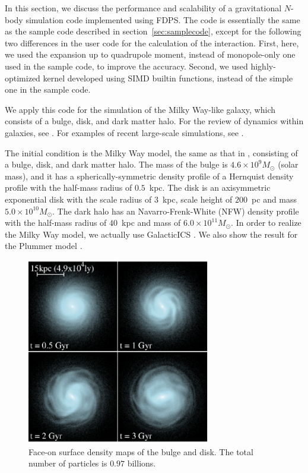In this section, we discuss the performance and scalability of a
gravitational $N$-body simulation code implemented using FDPS. The
code is essentially the same as the sample code described in
section~\ref{sec:samplecode}, except for the following two differences
in the user code for the calculation of the interaction. First, here,
we used the expansion up to quadrupole moment, instead of
monopole-only one used in the sample code, to improve the
accuracy. Second, we used highly-optimized kernel developed using SIMD
builtin functions, instead of the simple one in the sample code.

We apply this code for the simulation of the Milky Way-like galaxy,
which consists of a bulge, disk, and dark matter halo.  For the review
of dynamics within galaxies, see
\cite{2014PASA...31...35D}. For examples of recent large-scale
simulations, see \cite{2011ApJ...730..109F, Bedorf:2014:PGT:2683593.2683600}.

The initial condition is the Milky Way model, the same as that
in \cite{Bedorf:2014:PGT:2683593.2683600}, consisting of a bulge,
disk, and dark matter halo.  The mass of the bulge is $4.6 \times 10^9
M_\odot$ (solar mass), and it has a spherically-symmetric density
profile of a Hernquist density profile \cite{1990ApJ...356..359H} with
the half-mass radius of $0.5$~kpc. The disk is an axisymmetric
exponential disk with the scale radius of $3$~kpc, scale height of
$200$~pc and mass $5.0 \times 10^{10}M_\odot$. The dark halo has an
Navarro-Frenk-White (NFW) density profile \cite{1996ApJ...462..563N}
with the half-mass radius of $40$~kpc and mass of $6.0 \times 10^{11}
M_\odot$. In order to realize the Milky Way model, we actually use
GalacticICS \cite{2005ApJ...631..838W}.
We also show the result for the Plummer
model \cite{1911MNRAS..71..460P}. 

\begin{figure}
  \begin{center}
    \includegraphics[width=8cm]{fig/disk.eps}
  \end{center}
  \caption{Face-on surface density maps of the bulge and disk. The
  total number of particles is $0.97$ billions. }
  \label{fig:evolutiondisk}
\end{figure}

